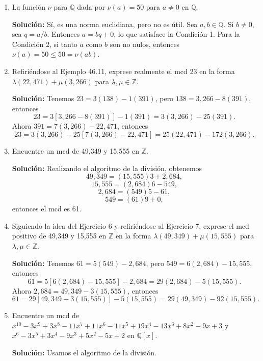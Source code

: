 \begin{enumerate}
    \item La función \( \nu \) para \( \mathbb{Q} \) dada por \( \nu(a) = 50 \) para \( a \neq 0 \) en \( \mathbb{Q} \).
    
    \textbf{Solución:} Sí, es una norma euclidiana, pero no es útil. Sea \( a, b \in \mathbb{Q} \). Si \( b \neq 0 \), sea \( q = a/b \). Entonces \( a = bq + 0 \), lo que satisface la Condición 1. Para la Condición 2, si tanto \( a \) como \( b \) son no nulos, entonces \( \nu(a) = 50 \leq 50 = \nu(ab) \).
    
    \item Refiriéndose al Ejemplo 46.11, exprese realmente el mcd 23 en la forma \( \lambda(22,471) + \mu(3,266) \) para \( \lambda, \mu \in \mathbb{Z} \).
    
    \textbf{Solución:} Tenemos \( 23 = 3(138) - 1(391) \), pero \( 138 = 3,266 - 8(391) \), entonces
    \[
    23 = 3[3,266 - 8(391)] - 1(391) = 3(3,266) - 25(391).
    \]
    Ahora \( 391 = 7(3,266) - 22,471 \), entonces
    \[
    23 = 3(3,266) - 25[7(3,266) - 22,471] = 25(22,471) - 172(3,266).
    \]
    
    \item Encuentre un mcd de 49,349 y 15,555 en \( \mathbb{Z} \).
    
    \textbf{Solución:} Realizando el algoritmo de la división, obtenemos
    \[
    49,349 = (15,555)3 + 2,684,
    \]
    \[
    15,555 = (2,684)6 - 549,
    \]
    \[
    2,684 = (549)5 - 61,
    \]
    \[
    549 = (61)9 + 0,
    \]
    entonces el mcd es 61.
    
    \item Siguiendo la idea del Ejercicio 6 y refiriéndose al Ejercicio 7, exprese el mcd positivo de 49,349 y 15,555 en \( \mathbb{Z} \) en la forma \( \lambda(49,349) + \mu(15,555) \) para \( \lambda, \mu \in \mathbb{Z} \).
    
    \textbf{Solución:} Tenemos \( 61 = 5(549) - 2,684 \), pero \( 549 = 6(2,684) - 15,555 \), entonces
    \[
    61 = 5[6(2,684) - 15,555] - 2,684 = 29(2,684) - 5(15,555).
    \]
    Ahora \( 2,684 = 49,349 - 3(15,555) \), entonces
    \[
    61 = 29[49,349 - 3(15,555)] - 5(15,555) = 29(49,349) - 92(15,555).
    \]
    
    \item Encuentre un mcd de \( x^{10} - 3x^9 + 3x^8 - 11x^7 + 11x^6 - 11x^5 + 19x^4 - 13x^3 + 8x^2 - 9x + 3 \) y \( x^6 - 3x^5 + 3x^4 - 9x^3 + 5x^2 - 5x + 2 \) en \( \mathbb{Q}[x] \).
    
    \textbf{Solución:} Usamos el algoritmo de la división.
    

\end{enumerate}
